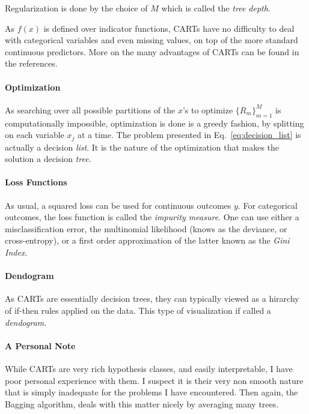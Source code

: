 \documentclass[12pt,a4paper]{article}
\theoremstyle{plain}
\theoremstyle{definition}
\newcommand{\hyp}{f}
\begin{document}
Regularization is done by the choice of $M$ which is called the \emph{tree depth}.

As $\hyp(x)$ is defined over indicator functions, CARTs have no difficulty to deal with categorical variables and even missing values, on top of the more standard continuous predictors. More on the many advantages of CARTs can be found in the references.

\paragraph{Optimization}
As searching over all possible partitions of the $x$'s to optimize $\{R_m\}_{m=1}^M$ is computationally impossible, optimization is done is a greedy fashion, by splitting on each variable $x_j$ at a time.
The problem presented in Eq.~\ref{eq:decision_list} is actually a decision \emph{list}. It is the nature of the optimization that makes the solution a decision \emph{tree}.


\paragraph{Loss Functions}
As usual, a squared loss can be used for continuous outcomes $y$.
For categorical outcomes, the loss function is called the \emph{impurity measure}.
One can use either a misclassification error, the multinomial likelihood (knows as the deviance, or cross-entropy), or a first order approximation of the latter known as the \emph{Gini Index}.


\paragraph{Dendogram}
As CARTs are essentially decision trees, they can typically viewed as a hirarchy of if-then rules applied on the data.
This type of visualization if called a \emph{dendogram}.

\paragraph{A Personal Note}
While CARTs are very rich hypothesis classes, and easily interpretable, I have poor personal experience with them. 
I suspect it is their very non smooth nature that is simply inadequate for the problems I have encountered.
Then again, the Bagging algorithm, deals with this matter nicely by averaging many trees.
\end{document}
